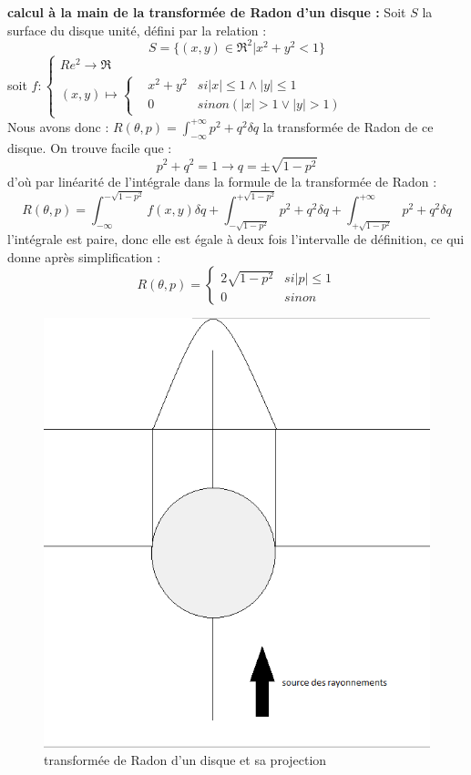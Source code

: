 \documentclass[conference]{IEEEtran}
\begin{document}
\textbf{calcul à la main de la transformée de Radon d'un disque : }
Soit $S$ la surface du disque unité, défini par la relation : \[S=\{(x,y)\in \Re^2|x^2+y^2<1\}\]
soit $f :\left\{\begin{array}{lcl}
Re^2 \to \Re \\
(x,y) \mapsto \left\{ \begin{array}{lcl}
&x^2+y^2 &si |x|\leq 1 \wedge |y|\leq 1 \\
&0 &sinon (|x|>1 \lor |y|>1)
\end{array}
\right.
\end{array}
\right.
$
\[\]
Nous avons donc : $R(\theta, p)=\int_{-\infty}^{+\infty} p^2+q^2 \delta q$ la transformée de Radon de ce disque. On trouve facile que :
\[p^2+q^2=1 \rightarrow q=\pm \sqrt{1-p^2} \]
d'où par linéarité de l'intégrale dans la formule de la transformée de Radon :
\[R(\theta,p)=\int_{-\infty}^{-\sqrt{1-p^2}} f(x,y) \delta q + \int_{-\sqrt{1-p^2}}^{+\sqrt{1-p^2}} p^2+q^2 \delta q+\int_{+\sqrt{1-p^2}}^{+\infty} p^2+q^2 \delta q \]
l'intégrale est paire, donc elle est égale à deux fois l'intervalle de définition, ce qui donne après simplification :
\[R(\theta,p)= \left\{\begin{array}{lcl}
2\sqrt{1-p^2} & si |p| \leq 1 \\
0 & sinon
\end{array}
\right. \]

\begin{figure}[H]
\centering
\includegraphics[scale=0.4]{transformeRadon}
\caption[transformée de Radon d'un disque et sa projection]{transformée de Radon d'un disque et sa projection}
\label{fig:gallery}
\end{figure}
\end{document}
